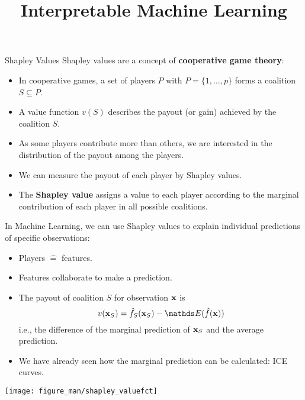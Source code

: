 \documentclass[11pt,compress,t,notes=noshow, aspectratio=169, xcolor=table]{beamer}
\title{Interpretable Machine Learning}
\date{}
\begin{document}
\newcommand{\learninggoals}{
\item Understand structure of tabular data in ML 
\item Understand difference between target and features 
\item Understand difference between labeled and unlabeled data 
\item Know concept of data-generating process}


\begin{vbframe}{Shapley Values}
Shapley values are a concept of \textbf{cooperative game theory}: 
\begin{itemize}
  \item In cooperative games, a set of players $P$ with $P = \{1, \hdots, p\}$ forms a coalition $S \subseteq P$. 
  \item A value function $v(S)$ describes the payout (or gain) achieved by the coalition $S$. 
  \item As some players contribute more than others, we are interested in the distribution of the payout among the players. 
  \item We can measure the payout of each player by Shapley values. 
  \item The \textbf{Shapley value} assigns a value to each player according to the marginal contribution of each player in all possible coalitions.
\end{itemize}

\framebreak
In Machine Learning, we can use Shapley values to explain individual predictions of specific observations: 
\begin{itemize}
  \item Players $\hat{=}$ features.
  \item Features collaborate to make a prediction.
  \item The payout of coalition $S$ for observation $\mathbf{x}$ is 
  $$v(\xv_S) =  \fh_{S} (\xv_S) - \E (\fh(\xv))$$ 
  i.e., the difference of the marginal prediction of $\mathbf{x}_S$ and the average prediction.
  \item We have already seen how the marginal prediction can be calculated: ICE curves. 
\end{itemize}
\begin{center}
\vspace{-0.3cm}
\texttt{[image: figure\_man/shapley\_valuefct]}
\end{center}
\framebreak


\end{vbframe}
\end{document}
